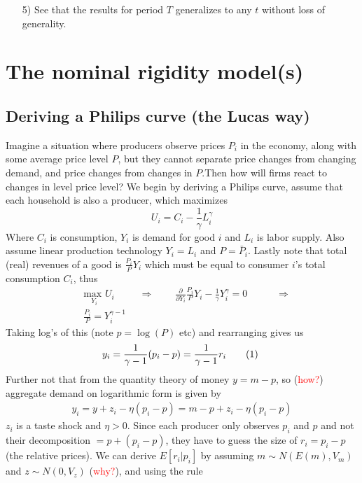 \documentclass[12pt, a4paper]{article}
\begin{document}
\begin{spacing}{1.213}
\begin{itemize}
\item[5)] See that the results for period $T$ generalizes to any $t$ without loss of generality.
\end{itemize}


\section{The nominal rigidity model(s)}
\subsection{Deriving a Philips curve (the Lucas way)}
Imagine a situation where producers observe prices $P_i$ in the economy, along with some average price level $P$, but they cannot separate price changes from changing demand, and price changes from changes in $P$.Then how will firms react to changes in level price level? We begin by deriving a Philips curve, assume that each household is also a producer, which maximizes 
\begin{equation}
U_i = C_i - \frac{1}{\gamma}L_i^{\gamma}
\end{equation}
Where $C_i$ is consumption, $Y_i$ is demand for good $i$ and $L_i$ is labor supply. Also assume linear production technology $Y_i = L_i$ and $P = \bar{P}_i$. Lastly note that total (real) revenues of a good is $\frac{P_i}{P}Y_i$ which must be equal to consumer $i$'s total consumption $C_i$, thus 
\begin{align*}
&\underset{Y_i}{\textrm{max }} U_i && \Rightarrow
&&& \frac{\partial }{\partial Y_i} \frac{P_i}{P}Y_i - \frac{1}{\gamma}Y_i^{\gamma}  = 0 &&&& \Rightarrow \\ 
&\frac{P_i}{P} = Y_i^{\gamma-1}
\end{align*}
Taking log's of this (note $p = \log(P)$ etc) and rearranging gives us  
\begin{align*}
y_i = \frac{1}{\gamma -1 }(p_i - p) = \frac{1}{\gamma -1 }r_i
\stepcounter{equation}\tag{\theequation}\label{eq: ybasic}\
\end{align*}
Further not that from the quantity theory of money $y = m-p$, so (\textcolor{red}{how?}) aggregate demand on logarithmic form is given by  
\begin{align*}
y_i = y + z_i - \eta (p_i - p) = m-p + z_i - \eta (p_i - p)
\end{align*}
$z_i$ is a taste shock and $\eta>0$. Since each producer only observes $p_i$ and $p$ and not their decomposition $= p + (p_i - p)$, they have to guess the size of $r_i = p_i - p$ (the relative prices). We can derive $E[r_i | p_i ]$ by assuming $m \sim N(E(m),V_m)$ and $z \sim N(0,V_z)$ (\textcolor{red}{why?}), and using the rule  

\end{spacing}
\end{document}
